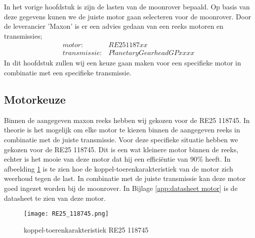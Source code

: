 In het vorige hoofdstuk is zijn de lasten van de moonrover bepaald. Op basis van deze gegevens kunen we de juiste motor gaan selecteren voor de moonrover. Door de leverancier 'Maxon' is er een advies gedaan van een reeks motoren en transmissies;
\begin{align*}
        motor: &RE25 1187xx\\
        transmissie: &Planetary Gearhead GP xx xx
\end{align*}
In dit hoofdstuk zullen wij een keuze gaan maken voor een specifieke motor in combinatie met een specifieke transmissie.


\subsection{Motorkeuze}
Binnen de aangegeven maxon reeks hebben wij gekozen voor de RE25 118745. In theorie is het mogelijk om elke motor te kiezen binnen de aangegeven reeks in combinatie met de juiste transmissie. Voor deze specifieke situatie hebben we gekozen voor de RE25 118745. Dit is een wat kleinere motor binnen de reeks, echter is het mooie van deze motor dat hij een efficiëntie van 90\% heeft. In afbeelding \ref{fig:RE25_118745} is te zien hoe de koppel-toerenkarakteristiek van de motor zich weerhoud tegen de last. In combinatie met de juiste transmissie kan deze motor goed ingezet worden bij de moonrover. In Bijlage \ref{app:datasheet motor} is de datasheet te zien van deze motor.
        \begin{figure}[H]
                \centering
                \texttt{[image: RE25\_118745.png]}
                \caption{koppel-toerenkarakteristiek RE25 118745}
                \label{fig:RE25_118745}
        \end{figure}

\newpage

